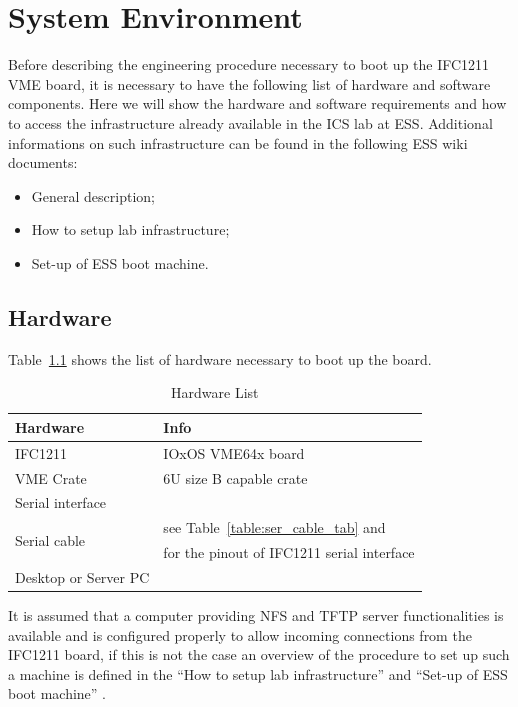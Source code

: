 \documentclass[11pt
  , a4paper
  , article
  , oneside
  , showtrims
]{memoir}
\begin{document}
\clearpage

\chapter{System Environment}
Before describing the engineering procedure necessary to boot up the IFC1211 VME board, it is necessary to have the following list of hardware and software components. Here we will show the hardware and software requirements and how to access the infrastructure already available in the ICS lab at ESS. Additional informations on such infrastructure can be found in the following ESS wiki documents:
\begin{itemize}
	\item  General description\cite{GDLI};
	\item  How to setup lab infrastructure\cite{SULI};
	\item  Set-up of ESS boot machine\cite{SETUP_LAB_INFRASTRUCTURE}.
\end{itemize}

\section{Hardware}
Table~\ref{table:hwlist} shows the list of hardware necessary to boot up the board. 

\begin{table}[!hb]
	\centering
	\begin{tabular}{l|l}
		\toprule
		Hardware                  & Info                             \\\midrule
		IFC1211                   & IOxOS VME64x board               \\\midrule
		VME Crate                 & 6U size B capable crate          \\\midrule
		Serial interface          &                                  \\\midrule
		\multicolumn{1}{l|}{\multirow{2}{*}{Serial cable}} & see Table~\ref{table:ser_cable_tab} and \cite{IFC1211_HW_TUG}\\
		                          & for the pinout of IFC1211 serial interface   \\\midrule
		Desktop or Server PC      &                                  \\\bottomrule
	\end{tabular}
	\caption[]{Hardware List}
	\label{table:hwlist}
\end{table}

It is assumed that a computer providing NFS and TFTP server functionalities is available and is configured properly to allow incoming connections from the IFC1211 board, if this is not the case an overview of the procedure to set up such a machine is defined in the ``How to setup lab infrastructure''\cite{SULI} and ``Set-up of ESS boot machine'' \cite{SETUP_LAB_INFRASTRUCTURE}.
\end{document}
